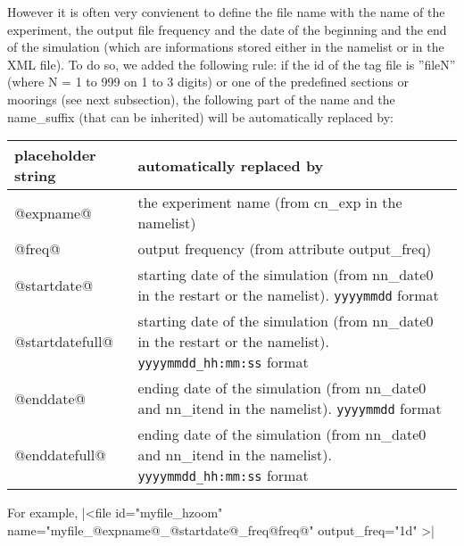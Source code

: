 \documentclass[../main/NEMO_manual]{subfiles}
\begin{document}
However it is often very convienent to define the file name with the name of the experiment,
the output file frequency and the date of the beginning and the end of the simulation
(which are informations stored either in the namelist or in the XML file).
To do so, we added the following rule:
if the id of the tag file is ''fileN'' (where N = 1 to 999 on 1 to 3 digits) or
one of the predefined sections or moorings (see next subsection),
the following part of the name and the name\_suffix (that can be inherited) will be automatically replaced by:

\begin{table}
  \begin{tabularx}{\textwidth}{|lX|}
    \hline
    \centering placeholder string &
    automatically replaced by                          \\
    \hline
    \hline
    \centering @expname@          &
    the experiment name (from cn\_exp in the namelist) \\
    \hline
    \centering @freq@             &
    output frequency (from attribute output\_freq)     \\
    \hline
    \centering @startdate@        &
    starting date of the simulation (from nn\_date0 in the restart or the namelist).
    \newline
    \verb?yyyymmdd?          format                   \\
    \hline
    \centering @startdatefull@    &
    starting date of the simulation (from nn\_date0 in the restart or the namelist).
    \newline
    \verb?yyyymmdd_hh:mm:ss? format                    \\
    \hline
    \centering @enddate@          &
    ending date of the simulation   (from nn\_date0 and nn\_itend  in the namelist).
    \newline
    \verb?yyyymmdd?          format                    \\
    \hline
    \centering @enddatefull@      &
    ending date of the simulation   (from nn\_date0 and nn\_itend  in the namelist).
    \newline
    \verb?yyyymmdd_hh:mm:ss? format                    \\
    \hline
  \end{tabularx}
\end{table}

\noindent For example,
\xmlline|<file id="myfile_hzoom" name="myfile_@expname@_@startdate@_freq@freq@" output_freq="1d" >|
\end{document}
